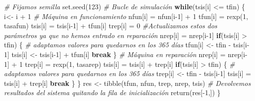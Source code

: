 \documentclass[
]{book}
\newenvironment{Shaded}{\begin{snugshade}}{\end{snugshade}}
\newcommand{\CommentTok}[1]{\textcolor[rgb]{0.56,0.35,0.01}{\textit{#1}}}
\newcommand{\ControlFlowTok}[1]{\textcolor[rgb]{0.13,0.29,0.53}{\textbf{#1}}}
\newcommand{\DecValTok}[1]{\textcolor[rgb]{0.00,0.00,0.81}{#1}}
\newcommand{\FunctionTok}[1]{\textcolor[rgb]{0.00,0.00,0.00}{#1}}
\newcommand{\NormalTok}[1]{#1}
\newcommand{\OtherTok}[1]{\textcolor[rgb]{0.56,0.35,0.01}{#1}}
\newcommand{\SpecialCharTok}[1]{\textcolor[rgb]{0.00,0.00,0.00}{#1}}
\theoremstyle{definition}
\theoremstyle{definition}
\theoremstyle{definition}
\theoremstyle{definition}
\theoremstyle{remark}
\begin{document}
\begin{Shaded}
\begin{Highlighting}[]
  \CommentTok{\# Fijamos semilla}
  \FunctionTok{set.seed}\NormalTok{(}\DecValTok{123}\NormalTok{)}
  \CommentTok{\# Bucle de simulación}
  \ControlFlowTok{while}\NormalTok{(tsis[i] }\SpecialCharTok{\textless{}=}\NormalTok{ tfin)}
\NormalTok{  \{}
\NormalTok{    i}\OtherTok{\textless{}{-}}\NormalTok{ i }\SpecialCharTok{+} \DecValTok{1}
    \CommentTok{\# Máquina en funcionamiento}
\NormalTok{    nfun[i] }\OtherTok{=}\NormalTok{ nfun[i}\DecValTok{{-}1}\NormalTok{] }\SpecialCharTok{+} \DecValTok{1}
\NormalTok{    tfun[i] }\OtherTok{=} \FunctionTok{rexp}\NormalTok{(}\DecValTok{1}\NormalTok{, tasafun) }
\NormalTok{    tsis[i] }\OtherTok{=}\NormalTok{ tsis[i}\DecValTok{{-}1}\NormalTok{] }\SpecialCharTok{+}\NormalTok{ tfun[i]}
\NormalTok{    trep[i] }\OtherTok{=} \DecValTok{0} \CommentTok{\#Actualizamos estos dos parámetros ya que no hemos entrado en reparación}
\NormalTok{    nrep[i] }\OtherTok{=}\NormalTok{ nrep[i}\DecValTok{{-}1}\NormalTok{]}
    \ControlFlowTok{if}\NormalTok{(tsis[i] }\SpecialCharTok{\textgreater{}}\NormalTok{ tfin) \{}
      \CommentTok{\# adaptamos valores para quedarnos en los 365 días}
\NormalTok{      tfun[i] }\OtherTok{\textless{}{-}}\NormalTok{ tfin }\SpecialCharTok{{-}}\NormalTok{ tsis[i}\DecValTok{{-}1}\NormalTok{]}
\NormalTok{      tsis[i] }\OtherTok{\textless{}{-}}\NormalTok{ tsis[i}\DecValTok{{-}1}\NormalTok{] }\SpecialCharTok{+}\NormalTok{ tfun[i]}
      \ControlFlowTok{break}
\NormalTok{      \}}
    \CommentTok{\# Máquina en reparación}
\NormalTok{    nrep[i] }\OtherTok{=}\NormalTok{ nrep[i}\DecValTok{{-}1}\NormalTok{] }\SpecialCharTok{+} \DecValTok{1}
\NormalTok{    trep[i] }\OtherTok{=} \FunctionTok{rexp}\NormalTok{(}\DecValTok{1}\NormalTok{, tasarep)}
\NormalTok{    tsis[i] }\OtherTok{=}\NormalTok{ tsis[i] }\SpecialCharTok{+}\NormalTok{ trep[i]}
    \ControlFlowTok{if}\NormalTok{(tsis[i] }\SpecialCharTok{\textgreater{}}\NormalTok{ tfin) \{}
    \CommentTok{\# adaptamos valores para quedarnos en los 365 días}
\NormalTok{      trep[i] }\OtherTok{\textless{}{-}}\NormalTok{ tfin }\SpecialCharTok{{-}}\NormalTok{ tsis[i}\DecValTok{{-}1}\NormalTok{] }
\NormalTok{      tsis[i] }\OtherTok{=}\NormalTok{ tsis[i] }\SpecialCharTok{+}\NormalTok{ trep[i]}
      \ControlFlowTok{break}
\NormalTok{      \}}
\NormalTok{  \}}
\NormalTok{  res }\OtherTok{\textless{}{-}} \FunctionTok{tibble}\NormalTok{(tfun, nfun, trep, nrep, tsis)}
  \CommentTok{\# Devolvemos resultados del sistema quitando la fila de inicialización}
  \FunctionTok{return}\NormalTok{(res[}\SpecialCharTok{{-}}\DecValTok{1}\NormalTok{,])}
\NormalTok{\}}
\end{Highlighting}
\end{Shaded}
\end{document}
